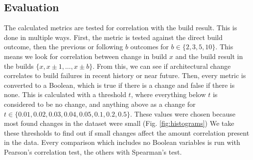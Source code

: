 \documentclass[conference]{IEEEtran}
\begin{document}
\subsection{Evaluation}

The calculated metrics are tested for correlation with the build result. This is done in multiple ways. First, the metric is tested against the direct build outcome, then the previous or following $b$ outcomes for $b \in \{2, 3, 5, 10\}$. This means we look for correlation between change in build $x$ and the build result in the builds $\{x, x \pm 1, \hdots, x \pm b\}$. From this, we can see if architectural change correlates to build failures in recent history or near future. 
Then, every metric is converted to a Boolean, which is true if there is a change and false if there is none. This is calculated with a threshold $t$, where everything below $t$ is considered to be no change, and anything above as a change for $t \in \{0.01, 0.02, 0.03, 0.04, 0.05, 0.1, 0.2, 0.5\}$. These values were chosen because most found changes in the dataset were small (Fig. \ref{fig:histograms}) We take these thresholds to find out if small changes affect the amount correlation present in the data. Every comparison which includes no Boolean variables is run with Pearson's correlation test, the others with Spearman's test. 
\end{document}
